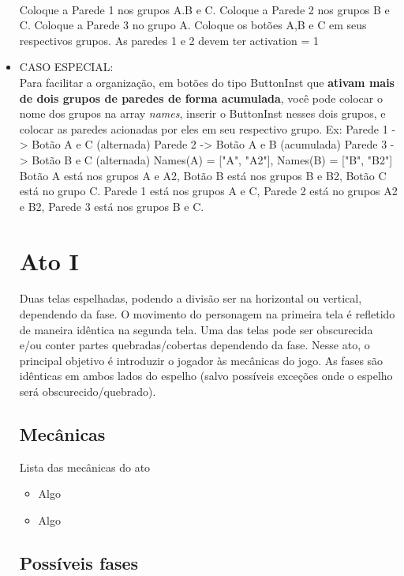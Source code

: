 \documentclass[a4paper, 11pt]{article}
\begin{document}
\begin{itemize}
				\\
				Coloque a Parede 1 nos grupos A.B e C. Coloque a Parede 2 nos grupos B e C. Coloque a Parede 3 no grupo A. Coloque os botões A,B e C em seus respectivos grupos.
				As paredes 1 e 2 devem ter activation = 1
				\item CASO ESPECIAL: \\
				Para facilitar a organização, em botões do tipo ButtonInst que \textbf{ativam mais de dois grupos de paredes de forma acumulada}, você pode colocar o nome dos grupos na array \textit{names}, inserir o ButtonInst nesses dois grupos, e colocar as paredes acionadas por eles em seu respectivo grupo.
				Ex:
				Parede 1 -> Botão A e C (alternada)
				Parede 2 -> Botão A e B (acumulada) 
 				Parede 3 -> Botão B e C (alternada)
 				Names(A) = ["A", "A2"], Names(B) = ["B", "B2"]
 				Botão A está nos grupos A e A2, Botão B está nos grupos B e B2, Botão C está no grupo C.
 				Parede 1 está nos grupos A e C, Parede 2 está no grupos A2 e B2, Parede 3 está nos grupos B e C.

\section{Ato I} 
 
	Duas telas espelhadas, podendo a divisão ser na horizontal ou vertical, dependendo da fase. O movimento do 
	personagem na primeira tela é refletido de maneira idêntica na segunda tela. Uma das telas pode ser obscurecida 
	e/ou conter partes quebradas/cobertas dependendo da fase. 
	Nesse ato, o principal objetivo é introduzir o jogador às mecânicas do jogo. As fases são idênticas 
	em ambos lados do espelho (salvo possíveis exceções onde o espelho será obscurecido/quebrado). 
 
\subsection{Mecânicas} 
 
	Lista das mecânicas do ato 
	\begin{itemize} 
		\item Algo 
		\item Algo 
	\end{itemize} 
 
\subsection{Possíveis fases} 
 

\end{itemize}
\end{document}
